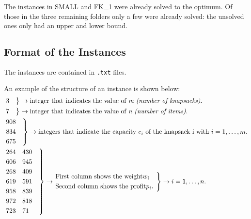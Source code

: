 The instances in SMALL and FK\_1 were already solved to the optimum.
Of those in the three remaining folders only a few were already solved: 
the unsolved ones only had an upper and lower bound.

\subsection{Format of the Instances}
The instances are contained in \texttt{.txt} files.

An example of the structure of an instance is shown below:
\[
    \begin{split}
        &\begin{rcases*}
             3 \quad
        \end{rcases*}
        \rightarrow \text{integer that indicates the value of \textit{m (number of knapsacks)}.}\\
        &\begin{rcases*}
             7 \quad
        \end{rcases*}
        \rightarrow \text{integer that indicates the value of \textit{n (number of items)}.}\\
        &\begin{rcases*}
             908 \quad\\
             834\\
             675\\
        \end{rcases*}
        \rightarrow \text{integers that indicate the capacity } c_{i} \text{ of the knapsack i with }
        \space i=1,\dots,m.\\
        &\begin{rcases*}
             264    \quad 430 \quad\\
             606 \quad    945\\
             268 \quad    409\\
             619 \quad    591\\
             958 \quad    839\\
             972 \quad    818\\
             723 \quad    71\\
        \end{rcases*}
        \rightarrow
        \begin{rcases*}
            \text{First column shows the weight} w_{i} \quad \\
            \text{Second column shows the profit} p_{i}.
        \end{rcases*}
        \rightarrow
        \space i=1,\dots,n.
    \end{split}
\]

